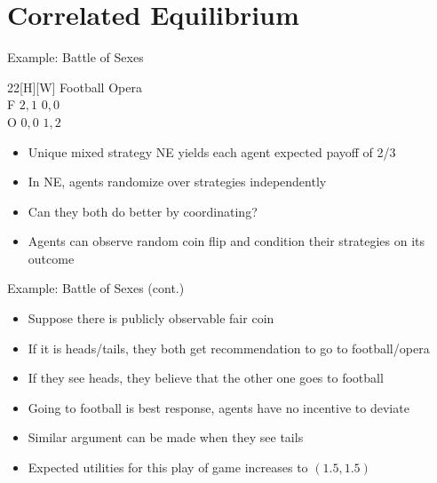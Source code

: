 \documentclass[11pt,aspectratio=169]{beamer}
\begin{document}
 \section{Correlated Equilibrium}
  \begin{frame}{Example: Battle of Sexes}
   \begin{center}
    \hspace{-9.8em}
    \begin{game}{2}{2}[H][W]
      	\> Football		\> Opera		\\
     F	\> $2, 1$		\> $0, 0$	\\
     O	\> $0, 0$		\> $1, 2$
    \end{game}
   \end{center}
   \vspace{1em}
   \begin{itemize}[<+->]
   	\item Unique mixed strategy NE yields each agent expected payoff of 2/3
    \item In NE, agents randomize over strategies \alert{independently}
    \item Can they both do better by coordinating?
    \item Agents can observe random coin flip and condition their strategies on its outcome
   \end{itemize}
  \end{frame}

  \begin{frame}{Example: Battle of Sexes (cont.)}
   \begin{itemize}[<+->]
   \setlength{\itemsep}{1.1em}
    \item Suppose there is \alert{publicly observable} fair coin
    \item If it is heads/tails, they both get \alert{recommendation} to go to football/opera
    \item If they see heads, they believe that the other one goes to football
    \item Going to football is best response, agents have \alert{no incentive to deviate}
    \item Similar argument can be made when they see tails
    \item Expected utilities for this play of game \alert{increases} to $(1.5, 1.5)$
   \end{itemize}
  \end{frame}
  
\end{document}
